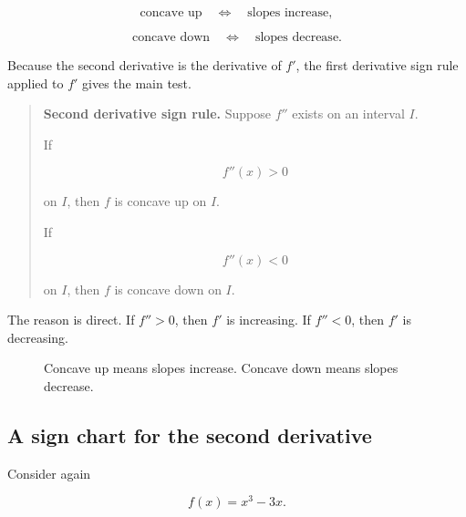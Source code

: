 \[
\text{concave up}
\quad\Longleftrightarrow\quad
\text{slopes increase},
\]

\[
\text{concave down}
\quad\Longleftrightarrow\quad
\text{slopes decrease}.
\]

Because the second derivative is the derivative of \(f'\), the first derivative sign rule
applied to \(f'\) gives the main test.

\begin{quote}
\textbf{Second derivative sign rule.}
Suppose \(f''\) exists on an interval \(I\).

If

\[
f''(x)>0
\]

on \(I\), then \(f\) is concave up on \(I\).

If

\[
f''(x)<0
\]

on \(I\), then \(f\) is concave down on \(I\).
\end{quote}

The reason is direct.  If \(f''>0\), then \(f'\) is increasing.  If \(f''<0\), then
\(f'\) is decreasing.

\begin{figure}[h]
\centering
{}
\caption{Concave up means slopes increase.  Concave down means slopes decrease.}
\label{fig:concave-up-down-basic}
\end{figure}

\subsection{A sign chart for the second derivative}
\label{subsec:second-derivative-sign-chart}

Consider again

\[
f(x)=x^3-3x.
\]

